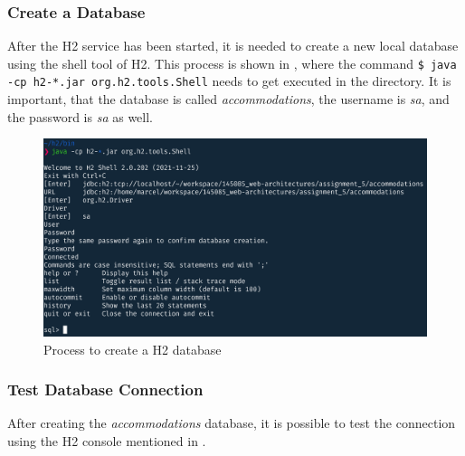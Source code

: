 \subsubsection{Create a Database}\label{sec:03_depl_h2_create}
After the H2 service has been started, it is needed to create a new local database using the shell tool of H2. This process is shown in , where the command \texttt{\$ java -cp h2-*.jar org.h2.tools.Shell} needs to get executed in the  directory. It is important, that the database is called \textit{accommodations}, the username is \textit{sa}, and the password is \textit{sa} as well.
\begin{figure}[h]
\centering
\includegraphics[scale=0.18]{images/03_depl/create-db}
\caption{Process to create a H2 database}
\label{fig:03_depl_createdb_create}
\end{figure}

\subsubsection{Test Database Connection}\label{sec:03_depl_h2_test}
After creating the \textit{accommodations} database, it is possible to test the connection using the H2 console mentioned in .

